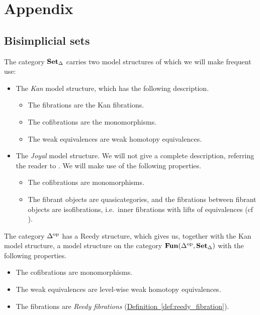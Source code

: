 \documentclass[main.tex]{subfiles}
\begin{document}
\appendix

\section{Appendix}

\subsection{Bisimplicial sets}
\label{sss:bisimplicial_sets}

The category $\mathbf{Set}_{\Delta}$ carries two model structures of which we will make frequent use:
\begin{itemize}
  \item The \emph{Kan} model structure, which has the following description.
    \begin{itemize}
      \item The fibrations are the Kan fibrations.

      \item The cofibrations are the monomorphisms.

      \item The weak equivalences are weak homotopy equivalences.
    \end{itemize}

  \item The \emph{Joyal} model structure. We will not give a complete description, referring the reader to \cite[Sec.\ 2.2.5]{highertopostheory}. We will make use of the following properties.
    \begin{itemize}
      \item The cofibrations are monomorphisms.

      \item The fibrant objects are quasicategories, and the fibrations between fibrant objects are isofibrations, i.e.\ inner fibrations with lifts of equivalences (cf \cite[Cor.\ 2.6.5]{highertopostheory}).
    \end{itemize}
\end{itemize}

The category $\Delta^{\mathrm{op}}$ has a Reedy structure, which gives us, together with the Kan model structure, a model structure on the category $\mathbf{Fun}(\Delta^{\mathrm{op}}, \mathbf{Set}_{\Delta})$ with the following properties.
\begin{itemize}
  \item The cofibrations are monomorphisms.

  \item The weak equivalences are level-wise weak homotopy equivalences.

  \item The fibrations are \emph{Reedy fibrations} (\hyperref[def:reedy_fibration]{Definition~\ref*{def:reedy_fibration}}).
\end{itemize}
\end{document}
